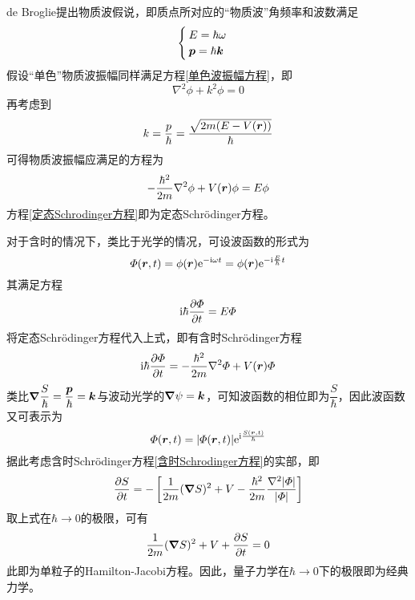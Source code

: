 de Broglie提出物质波假说，即质点所对应的“物质波”角频率和波数满足
\begin{equation}
\begin{cases}
	E = \hbar \omega \\
	\boldsymbol{p} = \hbar \boldsymbol{k}
\end{cases}
\end{equation}
假设“单色”物质波振幅同样满足方程\eqref{单色波振幅方程}，即
\begin{equation*}
	\nabla^2 \phi + k^2 \phi = 0
\end{equation*}
再考虑到
\begin{equation*}
	k = \frac{p}{\hbar} = \frac{\sqrt{2m(E-V(\boldsymbol{r}))}}{\hbar}
\end{equation*}
可得物质波振幅应满足的方程为
\begin{equation}
	-\frac{\hbar^2}{2m} \nabla^2\phi + V(\boldsymbol{r})\phi = E\phi
	\label{定态Schrodinger方程}
\end{equation}
方程\eqref{定态Schrodinger方程}即为{\heiti 定态Schr\"{o}dinger方程}。

对于含时的情况下，类比于光学的情况，可设波函数的形式为
\begin{equation*}
	\varPhi(\boldsymbol{r},t) = \phi(\boldsymbol{r}) \mathrm{e}^{-\mathrm{i} \omega t} = \phi(\boldsymbol{r}) \mathrm{e}^{-\mathrm{i} \frac{E}{\hbar} t}
\end{equation*}
其满足方程
\begin{equation}
	\mathrm{i}\hbar \frac{\partial \varPhi}{\partial t} = E\varPhi
\end{equation}
将定态Schr\"{o}dinger方程代入上式，即有{\heiti 含时Schr\"{o}dinger方程}
\begin{equation}
	\mathrm{i}\hbar \frac{\partial \varPhi}{\partial t} = -\frac{\hbar^2}{2m} \nabla^2\varPhi + V(\boldsymbol{r})\varPhi
	\label{含时Schrodinger方程}
\end{equation}
类比$\boldsymbol{\nabla} \dfrac{S}{\hbar} = \dfrac{\boldsymbol{p}}{\hbar} = \boldsymbol{k}$与波动光学的$\boldsymbol{\nabla} \psi = \boldsymbol{k}$，可知波函数的相位即为$\dfrac{S}{\hbar}$，因此波函数又可表示为
\begin{equation*}
	\varPhi(\boldsymbol{r},t) = |\varPhi(\boldsymbol{r},t)| \mathrm{e}^{\mathrm{i}\frac{S(\boldsymbol{r},t)}{\hbar}}
\end{equation*}
据此考虑含时Schr\"{o}dinger方程\eqref{含时Schrodinger方程}的实部，即
\begin{equation*}
	\frac{\partial S}{\partial t} = -\left[\frac{1}{2m} (\boldsymbol{\nabla} S)^2 + V - \frac{\hbar^2}{2m} \frac{\nabla^2 |\varPhi|}{|\varPhi|}\right]
\end{equation*}
取上式在$\hbar \to 0$的极限，可有
\begin{equation*}
	\frac{1}{2m} (\boldsymbol{\nabla} S)^2 + V + \frac{\partial S}{\partial t} = 0
\end{equation*}
此即为单粒子的Hamilton-Jacobi方程。因此，量子力学在$\hbar \to 0$下的极限即为经典力学。

